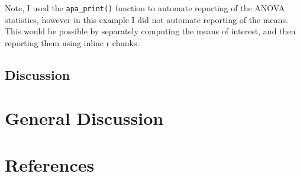 \documentclass[
  english,
  man,floatsintext]{apa6}
\begin{document}
Note, I used the \texttt{apa\_print()} function to automate reporting of the ANOVA statistics, however in this example I did not automate reporting of the means. This would be possible by separately computing the means of interest, and then reporting them using inline r chunks.

\hypertarget{discussion}{%
\subsection{Discussion}\label{discussion}}

\hypertarget{general-discussion}{%
\section{General Discussion}\label{general-discussion}}

\newpage

\hypertarget{references}{%
\section{References}\label{references}}

\begingroup
\setlength{\parindent}{-0.5in}
\setlength{\leftskip}{0.5in}
\end{document}
